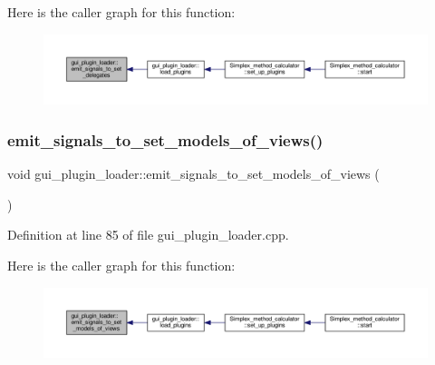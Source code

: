 Here is the caller graph for this function\+:\nopagebreak
\begin{figure}[H]
\begin{center}
\leavevmode
\includegraphics[width=350pt]{classgui__plugin__loader_a1aa2e332cd05954fcb9bbf506450c290_icgraph}
\end{center}
\end{figure}
\mbox{\label{classgui__plugin__loader_a41f08e87c06edd90551177c9d26e20b6}} 
\subsubsection{\texorpdfstring{emit\+\_\+signals\+\_\+to\+\_\+set\+\_\+models\+\_\+of\+\_\+views()}{emit\_signals\_to\_set\_models\_of\_views()}}
{\footnotesize\ttfamily void gui\+\_\+plugin\+\_\+loader\+::emit\+\_\+signals\+\_\+to\+\_\+set\+\_\+models\+\_\+of\+\_\+views (\begin{DoxyParamCaption}{ }\end{DoxyParamCaption})\hspace{0.3cm}{\ttfamily [private]}}



Definition at line 85 of file gui\+\_\+plugin\+\_\+loader.\+cpp.

Here is the caller graph for this function\+:\nopagebreak
\begin{figure}[H]
\begin{center}
\leavevmode
\includegraphics[width=350pt]{classgui__plugin__loader_a41f08e87c06edd90551177c9d26e20b6_icgraph}
\end{center}
\end{figure}
\mbox{\label{classgui__plugin__loader_afaea2c8da605ce9ee8e2995449a67eda}} 
